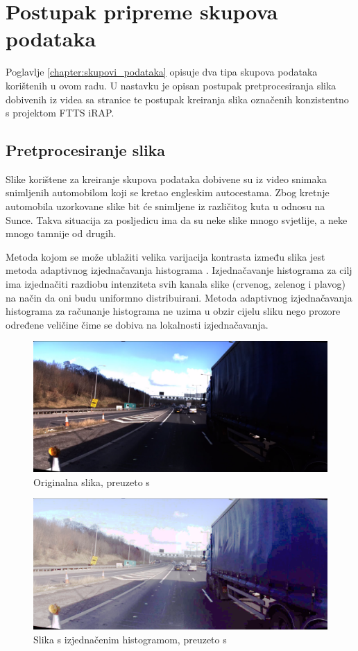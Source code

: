 \documentclass[times, utf8, diplomski, numeric]{fer}
\begin{document}
\section{Postupak pripreme skupova podataka}
Poglavlje \ref{chapter:skupovi_podataka} opisuje dva tipa skupova podataka korištenih u ovom radu.
U nastavku je opisan postupak pretprocesiranja slika dobivenih iz videa sa stranice \citep{url:ftts_irap} te postupak kreiranja slika označenih konzistentno s projektom FTTS iRAP.

\subsection{Pretprocesiranje slika}
Slike korištene za kreiranje skupova podataka dobivene su iz video snimaka snimljenih automobilom koji se kretao engleskim autocestama.
Zbog kretnje automobila uzorkovane slike bit će snimljene iz različitog kuta u odnosu na Sunce.
Takva situacija za posljedicu ima da su neke slike mnogo svjetlije, a neke mnogo tamnije od drugih.

Metoda kojom se može ublažiti velika varijacija kontrasta između slika jest metoda adaptivnog izjednačavanja histograma \citep{article:adapt_hist}.
Izjednačavanje histograma za cilj ima izjednačiti razdiobu intenziteta svih kanala slike (crvenog, zelenog i plavog) na način da oni budu uniformno distribuirani.
Metoda adaptivnog izjednačavanja histograma za računanje histograma ne uzima u obzir cijelu sliku nego prozore određene veličine čime se dobiva na lokalnosti izjednačavanja.

\begin{figure}[H]
\centering
\includegraphics[scale=0.2]{images/original.png}
\caption{Originalna slika, preuzeto s \citep{url:ftts_irap}}
\label{img:original}
\end{figure}

\begin{figure}[H]
\centering
\includegraphics[scale=0.2]{images/hist.png}
\caption{Slika s izjednačenim histogramom, preuzeto s \citep{url:ftts_irap}}
\label{img:hist}
\end{figure}
\end{document}
